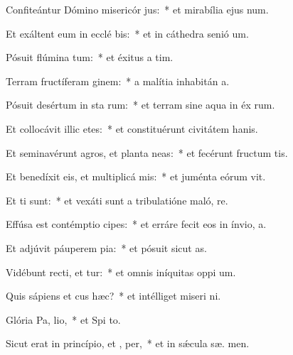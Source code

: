 \item Confiteántur Dómino misericór jus:~* et mirabília ejus  num.
\item Et exáltent eum in ecclé bis:~* et in cáthedra senió  um.
\item Pósuit flúmina  tum:~* et éxitus a  tim.
\item Terram fructíferam  ginem:~* a malítia inhabitán  a.
\item Pósuit desértum in sta rum:~* et terram sine aqua in éx rum.
\item Et collocávit illic etes:~* et constituérunt civitátem hanis.
\item Et seminavérunt agros, et planta neas:~* et fecérunt fructum tis.
\item Et benedíxit eis, et multiplicá  mis:~* et juménta eórum  vit.
\item Et  ti sunt:~* et vexáti sunt a tribulatióne maló,  re.
\item Effúsa est contémptio  cipes:~* et erráre fecit eos in ínvio,    a.
\item Et adjúvit páuperem  pia:~* et pósuit sicut  as.
\item Vidébunt recti, et tur:~* et omnis iníquitas oppi  um.
\item Quis sápiens et cus hæc?~* et intélliget miseri ni.
\item Glória Pa,  lio,~* et Spi to.
\item Sicut erat in princípio, et ,  per,~* et in sǽcula sæ. men.
